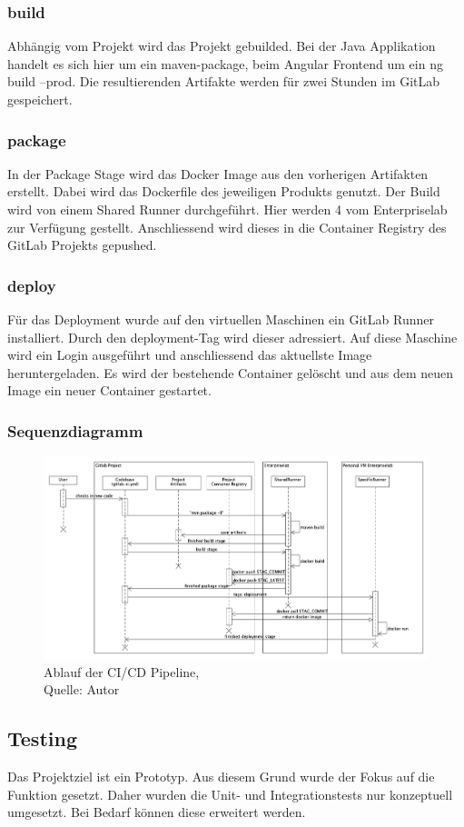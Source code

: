 \subsubsection{build}
Abhängig vom Projekt wird das Projekt gebuilded. Bei der Java Applikation handelt es sich hier um ein maven-package, beim Angular Frontend um ein ng build --prod. Die resultierenden Artifakte werden für zwei Stunden im GitLab gespeichert. 
\subsubsection{package}
In der Package Stage wird das Docker Image aus den vorherigen Artifakten erstellt. Dabei wird das Dockerfile des jeweiligen Produkts genutzt. Der Build wird von einem Shared Runner durchgeführt. Hier werden 4 vom Enterpriselab zur Verfügung gestellt. Anschliessend wird dieses in die Container Registry des GitLab Projekts gepushed. 
\subsubsection{deploy}
Für das Deployment wurde auf den virtuellen Maschinen ein GitLab Runner installiert. Durch den deployment-Tag wird dieser adressiert. Auf diese Maschine wird ein Login ausgeführt und anschliessend das aktuellste Image heruntergeladen. Es wird der bestehende Container gelöscht und aus dem neuen Image ein neuer Container gestartet. 

\subsubsection{Sequenzdiagramm}
\begin{figure}[H]
	\centering
	\includegraphics[width=1\textwidth]{images/sequenceCicd.png}
	\caption[Ablauf der CI/CD Pipeline]{Ablauf der CI/CD Pipeline,\\ Quelle: Autor}
	\label{img: cicdPipeline}
\end{figure}

\subsection{Testing}
Das Projektziel ist ein Prototyp. Aus diesem Grund wurde der Fokus auf die Funktion gesetzt. Daher wurden die Unit- und Integrationstests nur konzeptuell umgesetzt. Bei Bedarf können diese erweitert werden. 
\newpage
